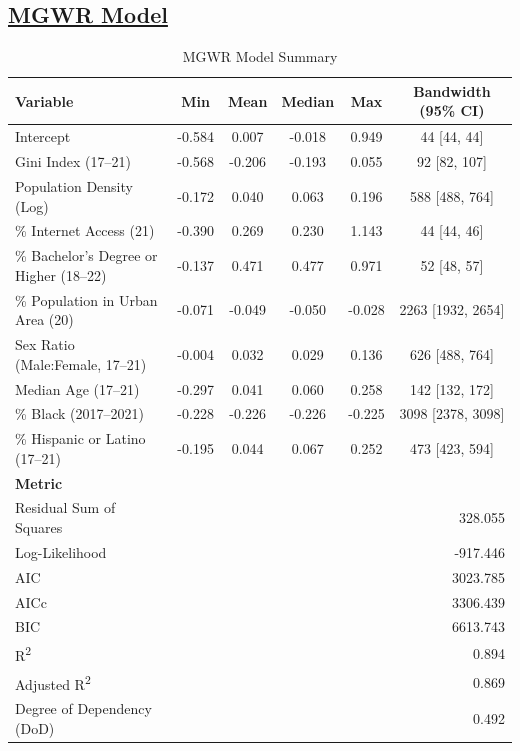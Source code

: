 \documentclass[
]{article}
\begin{document}
\newpage

\subsection{\texorpdfstring{\ul{MGWR
Model}}{MGWR Model}}\label{mgwr-model}

\begin{table}[H]
\renewcommand{\arraystretch}{1.3}
\centering
\caption{MGWR Model Summary}
\label{tab:mgwr_summary}
\begin{tabular}{lccccc}
\hline
\textbf{Variable} & \textbf{Min} & \textbf{Mean} & \textbf{Median} & \textbf{Max} & \textbf{Bandwidth (95\% CI)} \\ \hline
Intercept                & -0.584 & 0.007 & -0.018 & 0.949 & 44 [44, 44] \\ 
Gini Index (17–21)       & -0.568 & -0.206 & -0.193 & 0.055 & 92 [82, 107] \\ 
Population Density (Log) & -0.172 & 0.040 & 0.063 & 0.196 & 588 [488, 764] \\ 
\% Internet Access (21)  & -0.390 & 0.269 & 0.230 & 1.143 & 44 [44, 46] \\ 
\% Bachelor's Degree or Higher (18–22) & -0.137 & 0.471 & 0.477 & 0.971 & 52 [48, 57] \\ 
\% Population in Urban Area (20) & -0.071 & -0.049 & -0.050 & -0.028 & 2263 [1932, 2654] \\ 
Sex Ratio (Male:Female, 17–21) & -0.004 & 0.032 & 0.029 & 0.136 & 626 [488, 764] \\ 
Median Age (17–21)       & -0.297 & 0.041 & 0.060 & 0.258 & 142 [132, 172] \\ 
\% Black (2017–2021)     & -0.228 & -0.226 & -0.226 & -0.225 & 3098 [2378, 3098] \\ 
\% Hispanic or Latino (17–21) & -0.195 & 0.044 & 0.067 & 0.252 & 473 [423, 594] \\ \hline
\textbf{Metric} & \multicolumn{5}{l}{} \\ \hline
Residual Sum of Squares  & \multicolumn{5}{r}{328.055} \\
Log-Likelihood           & \multicolumn{5}{r}{-917.446} \\
AIC                      & \multicolumn{5}{r}{3023.785} \\
AICc                     & \multicolumn{5}{r}{3306.439} \\
BIC                      & \multicolumn{5}{r}{6613.743} \\
R\textsuperscript{2}     & \multicolumn{5}{r}{0.894} \\
Adjusted R\textsuperscript{2} & \multicolumn{5}{r}{0.869} \\
Degree of Dependency (DoD) & \multicolumn{5}{r}{0.492} \\ \hline
\end{tabular}
\end{table}
\end{document}
